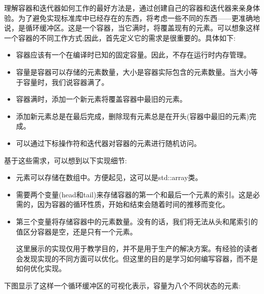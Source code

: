 
理解容器和迭代器如何工作的最好方法是，通过创建自己的容器和迭代器来亲身体验。为了避免实现标准库中已经存在的东西，将考虑一些不同的东西——更准确地说，是循环缓冲区。这是一个容器，当它满时，将覆盖现有的元素。可以想象这样一个容器的不同工作方式;因此，首先定义它的需求是很重要的。具体如下:

\begin{itemize}
\item
容器应该有一个在编译时已知的固定容量。因此，不存在运行时内存管理。

\item
容量是容器可以存储的元素数量，大小是容器实际包含的元素数量。当大小等于容量时，我们说容器满了。

\item
容器满时，添加一个新元素将覆盖容器中最旧的元素。

\item
添加新元素总是在最后完成，删除现有元素总是在开头(容器中最旧的元素)完成。

\item
可以通过下标操作符和迭代器对容器的元素进行随机访问。
\end{itemize}

基于这些需求，可以想到以下实现细节:

\begin{itemize}
\item
元素可以存储在数组中。方便起见，这可以是std::array类。

\item
需要两个变量(head和tail)来存储容器的第一个和最后一个元素的索引。这是必需的，因为容器的循环性质，开始和结束会随着时间的推移而变化。

\item
第三个变量将存储容器中的元素数量。没有的话，我们将无法从头和尾索引的值区分容器是空，还是只有一个元素。

\begin{tcolorbox}[breakable,enhanced jigsaw,colback=blue!5!white,colframe=blue!75!black,title={重要的Note}]
这里展示的实现仅用于教学目的，并不是用于生产的解决方案。有经验的读者会发现实现的不同方面可以优化。但这里的目的是学习如何编写容器，而不是如何优化实现。
\end{tcolorbox}

\end{itemize}

下图显示了这样一个循环缓冲区的可视化表示，容量为八个不同状态的元素:

